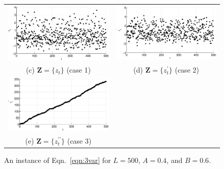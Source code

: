 {\begin{center}
\begin{figure}[h]
\begin{tabular}{cc}
\includegraphics[scale=0.35]{NoisyMultiResponseExample_z1.eps} & \includegraphics[scale=0.35]{NoisyMultiResponseExample_z2.eps} \\
(c) $\mathbf{Z} = \{z_t\}$ (case 1)& (d) $\mathbf{Z} = \{z_t^\prime\}$ (case 2) \\
\includegraphics[scale=0.35]{NoisyMultiResponseExample_z3.eps} &  \\
(e) $\mathbf{Z} = \{z_t^{\prime\prime}\}$ (case 3)& 
\end{tabular}
\caption[An instance of Eqn.\ \ref{eqn:3var}]{An instance of Eqn.\ \ref{eqn:3var} for $L=500$, $A=0.4$, and $B=0.6$.}
\label{fig:3varxyplot}
\end{figure}
\end{center}
\vspace*{\fill}
}

